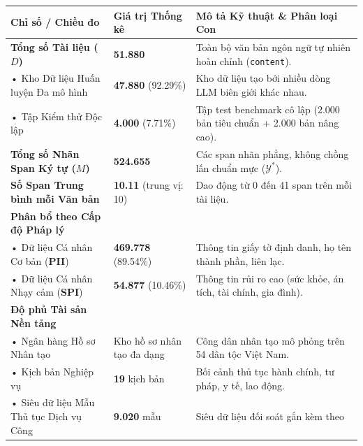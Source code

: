 \documentclass[
  11pt,
  a4paper,
]{article}
\newcounter{none} %
\begin{document}
{\def\LTcaptype{none} %
\begin{longtable}[]{@{}
  >{\raggedright\arraybackslash}p{}
  >{\centering\arraybackslash}p{}
  >{\raggedright\arraybackslash}p{}@{}}
\toprule\noalign{}
\begin{minipage}[b]{\linewidth}\raggedright
Chỉ số / Chiều đo
\end{minipage} & \begin{minipage}[b]{\linewidth}\centering
Giá trị Thống kê
\end{minipage} & \begin{minipage}[b]{\linewidth}\raggedright
Mô tả Kỹ thuật \& Phân loại Con
\end{minipage} \\
\midrule\noalign{}
\endhead
\bottomrule\noalign{}
\endlastfoot
\textbf{Tổng số Tài liệu (\(D\))} & \textbf{51.880} & Toàn bộ văn bản ngôn ngữ tự nhiên hoàn chỉnh
(\texttt{content}). \\
• Kho Dữ liệu Huấn luyện Đa mô hình & \textbf{47.880} (92.29\%) & Kho dữ liệu tạo bởi nhiều dòng LLM
biên giới khác nhau. \\
• Tập Kiểm thử Độc lập & \textbf{4.000} (7.71\%) & Tập test benchmark cô lập (2.000 bản tiêu chuẩn +
2.000 bản nâng cao). \\
\textbf{Tổng số Nhãn Span Ký tự (\(M\))} & \textbf{524.655} & Các span nhãn phẳng, không chồng lấn
chuẩn mực (\(\mathcal{Y}^*\)). \\
\textbf{Số Span Trung bình mỗi Văn bản} & \textbf{10.11} (trung vị: 10) & Dao động từ 0 đến 41 span
trên mỗi tài liệu. \\
\textbf{Phân bổ theo Cấp độ Pháp lý} & & \\
• Dữ liệu Cá nhân Cơ bản (\textbf{PII}) & \textbf{469.778} (89.54\%) & Thông tin giấy tờ định danh,
họ tên thành phần, liên lạc. \\
• Dữ liệu Cá nhân Nhạy cảm (\textbf{SPI}) & \textbf{54.877} (10.46\%) & Thông tin rủi ro cao (sức
khỏe, án tích, tài chính, gia đình). \\
\textbf{Độ phủ Tài sản Nền tảng} & & \\
• Ngân hàng Hồ sơ Nhân tạo & Kho hồ sơ nhân tạo đa dạng & Công dân nhân tạo mô phỏng trên 54 dân tộc
Việt Nam. \\
• Kịch bản Nghiệp vụ & \textbf{19} kịch bản & Bối cảnh thủ tục hành chính, tư pháp, y tế, lao
động. \\
• Siêu dữ liệu Mẫu Thủ tục Dịch vụ Công & \textbf{9.020} mẫu & Siêu dữ liệu đối soát gắn kèm theo

\end{longtable}}
\end{document}
